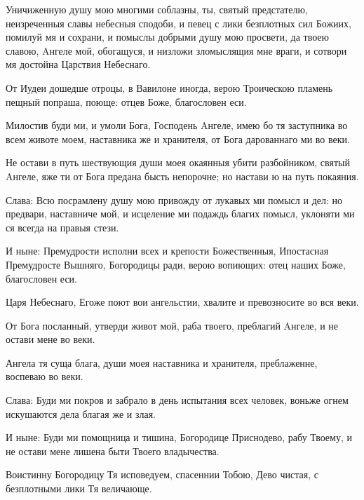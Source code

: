 \medskip



  Уничиженную душу мою многими соблазны, ты, святый предстателю, неизреченныя славы небесныя сподоби, и певец с лики безплотных сил Божиих, помилуй мя и сохрани, и помыслы добрыми душу мою просвети, да твоею славою, Aнгеле мой, обогащуся, и низложи зломыслящия мне враги, и сотвори мя достойна Царствия Небеснаго.




\medskip



  От Иудеи дошедше отроцы, в Вавилоне иногда, верою Троическою пламень пещный попраша, поюще: отцев Боже, благословен еси.


  Милостив буди ми, и умоли Бога, Господень Aнгеле, имею бо тя заступника во всем животе моем, наставника же и хранителя, от Бога дарованнаго ми во веки.


  Не остави в путь шествующия души моея окаянныя убити разбойником, святый Aнгеле, яже ти от Бога предана бысть непорочне; но настави ю на путь покаяния.


  Слава: Всю посрамлену душу мою привожду от лукавых ми помысл и дел: но предвари, наставниче мой, и исцеление ми подаждь благих помысл, уклоняти ми ся всегда на правыя стези.


  И ныне: Премудрости исполни всех и крепости Божественныя, Ипостасная Премудросте Вышняго, Богородицы ради, верою вопиющих: отец наших Боже, благословен еси.




\medskip



  Царя Небеснаго, Егоже поют вои ангельстии, хвалите и превозносите во вся веки.


  От Бога посланный, утверди живот мой, раба твоего, преблагий Aнгеле, и не остави мене во веки.


  Ангела тя суща блага, души моея наставника и хранителя, преблаженне, воспеваю во веки.


  Слава: Буди ми покров и забрало в день испытания всех человек, воньже огнем искушаются дела благая же и злая.


  И ныне: Буди ми помощница и тишина, Богородице Приснодево, рабу Твоему, и не остави мене лишена быти Твоего владычества.




\medskip



  Воистинну Богородицу Тя исповедуем, спасеннии Тобою, Дево чистая, с безплотными лики Тя величающе.


